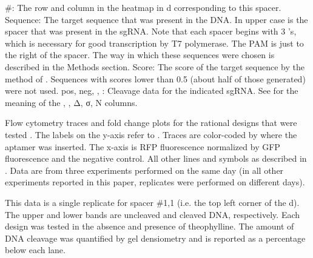 \documentclass[10pt,oneside]{article}
\begin{document}
    \#: The row and column in the heatmap in d corresponding to this spacer.
    Sequence: The  target sequence that was present in the DNA.  In upper case is the  spacer that was present in the sgRNA.  Note that each spacer begins with 3 's, which is necessary for good transcription by T7 polymerase.  The  PAM is just to the right of the spacer.  The way in which these sequences were chosen is described in the Methods section.
    Score: The score of the target sequence by the method of .  Sequences with scores lower than 0.5 (about half of those generated) were not used.
    pos, neg, \ligrnaF{}, \ligrnaB{}: Cleavage data for the indicated sgRNA.  See  for the meaning of the \apo{}, \holo{}, Δ, σ, N columns.



      Flow cytometry traces and fold change plots for the rational designs that were tested \invivo{}.  The labels on the y-axis refer to .  Traces are color-coded by where the aptamer was inserted.  The x-axis is RFP fluorescence normalized by GFP fluorescence and the negative control.  All other lines and symbols as described in .  Data are from three experiments performed on the same day (in all other experiments reported in this paper, replicates were performed on different days).



      This data is a single replicate for spacer \#1,1 (i.e. the top left corner of the d).  The upper and lower bands are uncleaved and cleaved DNA, respectively.  Each design was tested in the absence and presence of theophylline.  The amount of DNA cleavage was quantified by gel densiometry and is reported as a percentage below each lane.


\end{document}
